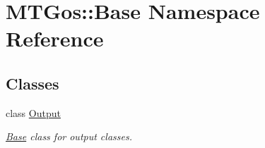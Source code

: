 \hypertarget{namespace_m_t_gos_1_1_base}{}\section{M\+T\+Gos\+:\+:Base Namespace Reference}
\label{namespace_m_t_gos_1_1_base}
\subsection*{Classes}
\begin{DoxyCompactItemize}
\item 
class \hyperlink{class_m_t_gos_1_1_base_1_1_output}{Output}
\begin{DoxyCompactList}\small\item\em \hyperlink{namespace_m_t_gos_1_1_base}{Base} class for output classes. \end{DoxyCompactList}\end{DoxyCompactItemize}
